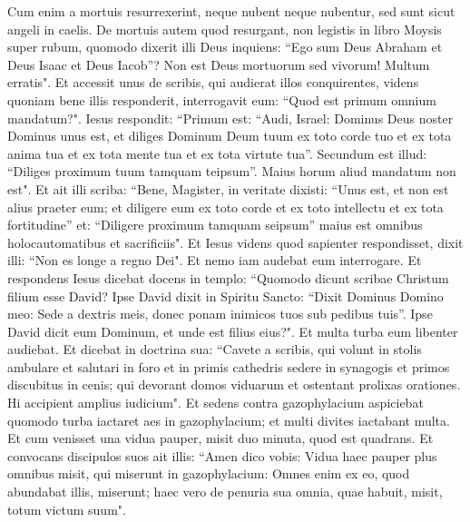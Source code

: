 \begin{biblechapter}
\verse Cum enim a mortuis resurrexerint, neque nubent neque nubentur, sed sunt sicut angeli in caelis. 
\verse De mortuis autem quod resurgant, non legistis in libro Moysis super rubum, quomodo dixerit illi Deus inquiens: “Ego sum Deus Abraham et Deus Isaac et Deus Iacob”? 
\verse Non est Deus mortuorum sed vivorum! Multum erratis". 
\verse Et accessit unus de scribis, qui audierat illos conquirentes, videns quoniam bene illis responderit, interrogavit eum: “Quod est primum omnium mandatum?".  
\verse Iesus respondit: “Primum est: “Audi, Israel: Dominus Deus noster Dominus unus est, 
\verse et diliges Dominum Deum tuum ex toto corde tuo et ex tota anima tua et ex tota mente tua et ex tota virtute tua”. 
\verse Secundum est illud: “Diliges proximum tuum tamquam teipsum”. Maius horum aliud mandatum non est".  
\verse Et ait illi scriba: “Bene, Magister, in veritate dixisti: “Unus est, et non est alius praeter eum; 
\verse et diligere eum ex toto corde et ex toto intellectu et ex tota fortitudine” et: “Diligere proximum tamquam seipsum” maius est omnibus holocautomatibus et sacrificiis". 
\verse Et Iesus videns quod sapienter respondisset, dixit illi: “Non es longe a regno Dei". Et nemo iam audebat eum interrogare. 
\verse Et respondens Iesus dicebat docens in templo: “Quomodo dicunt scribae Christum filium esse David? 
\verse Ipse David dixit in Spiritu Sancto: “Dixit Dominus Domino meo: Sede a dextris meis, donec ponam inimicos tuos sub pedibus tuis”. 
\verse Ipse David dicit eum Dominum, et unde est filius eius?". Et multa turba eum libenter audiebat. 
\verse Et dicebat in doctrina sua: “Cavete a scribis, qui volunt in stolis ambulare et salutari in foro 
\verse et in primis cathedris sedere in synagogis et primos discubitus in cenis; 
\verse qui devorant domos viduarum et ostentant prolixas orationes. Hi accipient amplius iudicium". 
\verse Et sedens contra gazophylacium aspiciebat quomodo turba iactaret aes in gazophylacium; et multi divites iactabant multa. 
\verse Et cum venisset una vidua pauper, misit duo minuta, quod est quadrans. 
\verse Et convocans discipulos suos ait illis: “Amen dico vobis: Vidua haec pauper plus omnibus misit, qui miserunt in gazophylacium: 
\verse Omnes enim ex eo, quod abundabat illis, miserunt; haec vero de penuria sua omnia, quae habuit, misit, totum victum suum". 
\end{biblechapter}

